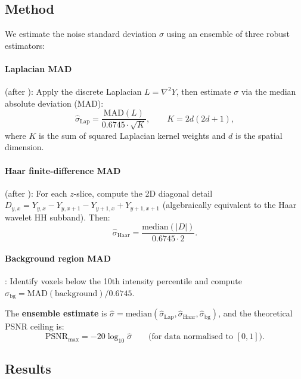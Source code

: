 \documentclass[11pt, a4paper]{article}
\theoremstyle{plain}
\theoremstyle{definition}
\theoremstyle{remark}
\newcommand{\PSNR}{\mathrm{PSNR}}
\begin{document}
\subsection{Method}

We estimate the noise standard deviation $\sigma$ using an ensemble of
three robust estimators:

\paragraph{Laplacian MAD} (after \citet{immerkaer1996fast}):
Apply the discrete Laplacian $L = \nabla^2 Y$, then estimate $\sigma$
via the median absolute deviation (MAD):
\begin{equation}
  \hat{\sigma}_{\text{Lap}} = \frac{\text{MAD}(L)}{0.6745 \cdot \sqrt{K}},
  \qquad K = 2d(2d+1),
\end{equation}
where $K$ is the sum of squared Laplacian kernel weights and $d$ is
the spatial dimension.

\paragraph{Haar finite-difference MAD} (after \citet{donoho1994ideal}):
For each $z$-slice, compute the 2D diagonal detail
$D_{y,x} = Y_{y,x} - Y_{y,x+1} - Y_{y+1,x} + Y_{y+1,x+1}$
(algebraically equivalent to the Haar wavelet HH subband). Then:
\begin{equation}
  \hat{\sigma}_{\text{Haar}} = \frac{\text{median}(|D|)}{0.6745 \cdot 2}.
\end{equation}

\paragraph{Background region MAD}: Identify voxels below the 10th
intensity percentile and compute $\hat{\sigma}_{\text{bg}} =
\text{MAD}(\text{background}) / 0.6745$.

The \textbf{ensemble estimate} is $\hat{\sigma} =
\text{median}(\hat{\sigma}_{\text{Lap}}, \hat{\sigma}_{\text{Haar}},
\hat{\sigma}_{\text{bg}})$, and the theoretical PSNR ceiling is:
\begin{equation}
  \PSNR_{\max} = -20\log_{10}\hat{\sigma}
  \qquad \text{(for data normalised to $[0,1]$)}.
  \label{eq:psnr-max}
\end{equation}

\subsection{Results}
\end{document}
